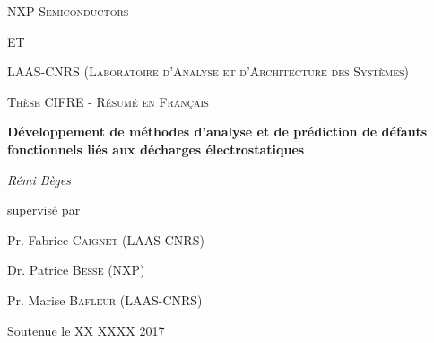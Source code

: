 \documentclass[11pt,a4paper]{book}
\title{}
\author{ \\ }
\date{Résumé en français}
\begin{document}
\begin{titlepage}
	\centering
	{\scshape NXP Semiconductors \par}
	\vspace{0.5cm}
  {\scshape ET \par}
	\vspace{0.5cm}
  {\scshape LAAS-CNRS (Laboratoire d'Analyse et d'Architecture des Systèmes) \par}
  \vspace{1cm}
	{\scshape\Large Thèse CIFRE - Résumé en Français\par}
	\vspace{1.5cm}
	{\huge\bfseries Développement de méthodes d'analyse et de prédiction de défauts fonctionnels liés aux décharges électrostatiques\par}
	\vspace{2cm}
	{\Large\itshape Rémi Bèges\par}
	\vfill
	supervisé par\par
	Pr. Fabrice \textsc{Caignet} (LAAS-CNRS)\par
  Dr. Patrice \textsc{Besse} (NXP)\par
  Pr. Marise \textsc{Bafleur} (LAAS-CNRS)\par

	\vfill

	{\large Soutenue le XX XXXX 2017\par}
\end{titlepage}








\tableofcontents



\printindex
\printglossary
\end{document}
